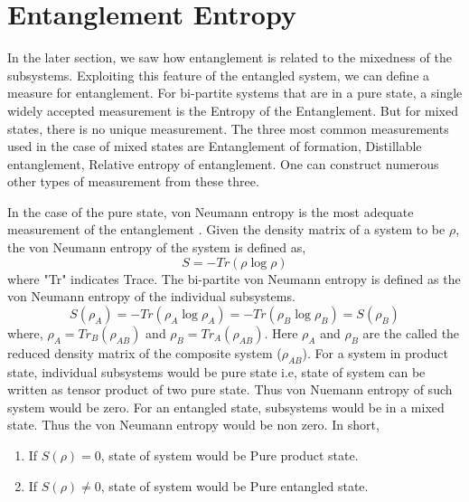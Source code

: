 \documentclass[12pt,a4paper]{report}
\begin{document}
\section{Entanglement Entropy}
In the later section, we saw how entanglement is related to the mixedness of the subsystems. Exploiting this feature of the entangled system, we can define a measure for entanglement. For bi-partite systems that are in a pure state, a single widely accepted measurement is the Entropy of the Entanglement. But for mixed states, there is no unique measurement. The three most common measurements used in the case of mixed states are Entanglement of formation, Distillable entanglement, Relative entropy of entanglement. One can construct numerous other types of measurement from these three.\par
In the case of the pure state, von Neumann entropy is the most adequate measurement of the entanglement \cite{bennet96c}. Given the density matrix of a system to be $\rho$, the von Neumann entropy of the system is defined as,
\begin{equation}
S = -Tr(\rho\log\rho)
\end{equation}
where "Tr" indicates Trace. The bi-partite von Neumann entropy is defined as the von Neumann entropy of the individual subsystems.
\begin{equation}
S(\rho_{A}) = -Tr(\rho_{A}\log\rho_{A}) =  -Tr(\rho_{B}\log\rho_{B})=S(\rho_{B})
\end{equation}
where, $\rho_{A}=Tr_{B}(\rho_{AB})$ and $\rho_{B}=Tr_{A}(\rho_{AB})$. Here $\rho_{A}$ and $\rho_{B}$ are the called the reduced density matrix of the composite system ($\rho_{AB}$). For a system in product state, individual subsystems would be pure state i.e, state of system can be written as tensor product of two pure state. Thus von Nuemann entropy of such system would be zero. For an entangled state, subsystems would be in a mixed state. Thus the von Neumann entropy would be non zero. In short,
\begin{enumerate}
    \item If $S(\rho)= 0$, state of system would be Pure product state.
    \item If $S(\rho)\neq 0$, state of system would be Pure entangled state.
\end{enumerate}
\end{document}
